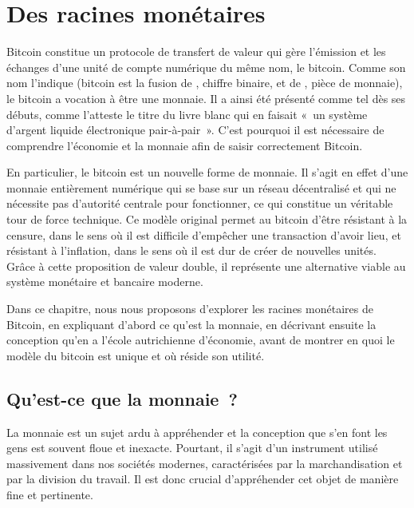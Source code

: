 
\chapter{Des racines monétaires}
\label{ch:monnaie}

Bitcoin constitue un protocole de transfert de valeur qui gère l'émission et les échanges d'une unité de compte numérique du même nom, le bitcoin. Comme son nom l'indique (bitcoin est la fusion de , chiffre binaire, et de , pièce de monnaie), le bitcoin a vocation à être une monnaie. Il a ainsi été présenté comme tel dès ses débuts, comme l'atteste le titre du livre blanc qui en faisait «~un système d'argent liquide électronique pair-à-pair~». C'est pourquoi il est nécessaire de comprendre l'économie et la monnaie afin de saisir correctement Bitcoin.

En particulier, le bitcoin est un nouvelle forme de monnaie. Il s'agit en effet d'une monnaie entièrement numérique qui se base sur un réseau décentralisé et qui ne nécessite pas d'autorité centrale pour fonctionner, ce qui constitue un véritable tour de force technique. Ce modèle original permet au bitcoin d'être résistant à la censure, dans le sens où il est difficile d'empêcher une transaction d'avoir lieu, et résistant à l'inflation, dans le sens où il est dur de créer de nouvelles unités. Grâce à cette proposition de valeur double, il représente une alternative viable au système monétaire et bancaire moderne.

Dans ce chapitre, nous nous proposons d'explorer les racines monétaires de Bitcoin, en expliquant d'abord ce qu'est la monnaie, en décrivant ensuite la conception qu'en a l'école autrichienne d'économie, avant de montrer en quoi le modèle du bitcoin est unique et où réside son utilité.

\section*{Qu'est-ce que la monnaie~?}

La monnaie est un sujet ardu à appréhender et la conception que s'en font les gens est souvent floue et inexacte. Pourtant, il s'agit d'un instrument utilisé massivement dans nos sociétés modernes, caractérisées par la marchandisation et par la division du travail. Il est donc crucial d'appréhender cet objet de manière fine et pertinente.

